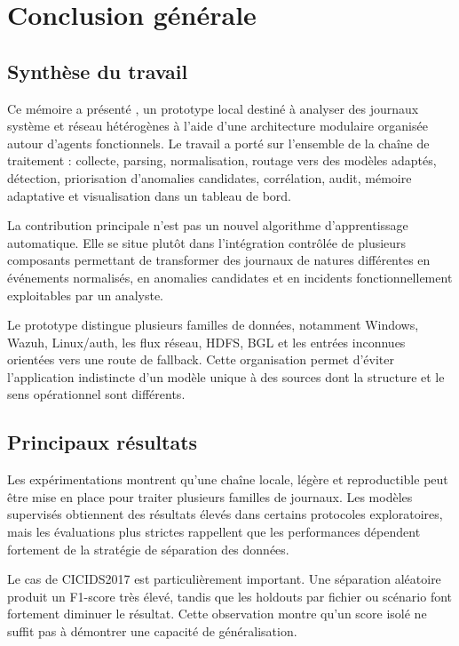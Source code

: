 \chapter{Conclusion générale}

\section{Synthèse du travail}

Ce mémoire a présenté \logminer{}, un prototype local destiné à analyser des journaux système et réseau hétérogènes à l'aide d'une architecture modulaire organisée autour d'agents fonctionnels. Le travail a porté sur l'ensemble de la chaîne de traitement : collecte, parsing, normalisation, routage vers des modèles adaptés, détection, priorisation d'anomalies candidates, corrélation, audit, mémoire adaptative et visualisation dans un tableau de bord.

La contribution principale n'est pas un nouvel algorithme d'apprentissage automatique. Elle se situe plutôt dans l'intégration contrôlée de plusieurs composants permettant de transformer des journaux de natures différentes en événements normalisés, en anomalies candidates et en incidents fonctionnellement exploitables par un analyste.

Le prototype distingue plusieurs familles de données, notamment Windows, Wazuh, Linux/auth, les flux réseau, HDFS, BGL et les entrées inconnues orientées vers une route de fallback. Cette organisation permet d'éviter l'application indistincte d'un modèle unique à des sources dont la structure et le sens opérationnel sont différents.

\section{Principaux résultats}

Les expérimentations montrent qu'une chaîne locale, légère et reproductible peut être mise en place pour traiter plusieurs familles de journaux. Les modèles supervisés obtiennent des résultats élevés dans certains protocoles exploratoires, mais les évaluations plus strictes rappellent que les performances dépendent fortement de la stratégie de séparation des données.

Le cas de CICIDS2017 est particulièrement important. Une séparation aléatoire produit un F1-score très élevé, tandis que les holdouts par fichier ou scénario font fortement diminuer le résultat. Cette observation montre qu'un score isolé ne suffit pas à démontrer une capacité de généralisation.

